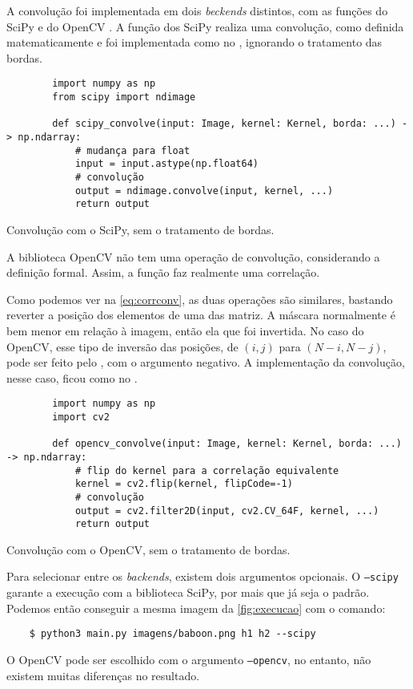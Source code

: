 A convolução foi implementada em dois \textit{beckends} distintos, com as funções  do SciPy \autocite{ref:ndimage} e  do OpenCV \autocite{ref:cvfilter}. A função dos SciPy realiza uma convolução, como definida matematicamente e foi implementada como no , ignorando o tratamento das bordas.

\begin{listing}[H]
    \begin{verbatim}
        import numpy as np
        from scipy import ndimage

        def scipy_convolve(input: Image, kernel: Kernel, borda: ...) -> np.ndarray:
            # mudança para float
            input = input.astype(np.float64)
            # convolução
            output = ndimage.convolve(input, kernel, ...)
            return output
    \end{verbatim}

    \caption{Convolução com o SciPy, sem o tratamento de bordas.}
    \label{code:scipy}
\end{listing}

A biblioteca OpenCV não tem uma operação de convolução, considerando a definição formal. Assim, a função  faz realmente uma correlação.

Como podemos ver na \cref{eq:corrconv}, as duas operações são similares, bastando reverter a posição dos elementos de uma das matriz. A máscara normalmente é bem menor em relação à imagem, então ela que foi invertida. No caso do OpenCV, esse tipo de inversão das posições, de $(i, j)$ para $(N-i, N-j)$, pode ser feito pelo  \autocite{ref:cvflip}, com o argumento  negativo. A implementação da convolução, nesse caso, ficou como no .

\begin{listing}[H]
    \begin{verbatim}
        import numpy as np
        import cv2

        def opencv_convolve(input: Image, kernel: Kernel, borda: ...) -> np.ndarray:
            # flip do kernel para a correlação equivalente
            kernel = cv2.flip(kernel, flipCode=-1)
            # convolução
            output = cv2.filter2D(input, cv2.CV_64F, kernel, ...)
            return output
    \end{verbatim}

    \caption{Convolução com o OpenCV, sem o tratamento de bordas.}
    \label{code:opencv}
\end{listing}

Para selecionar entre os \textit{backends}, existem dois argumentos opcionais. O \texttt{--scipy} garante a execução com a biblioteca SciPy, por mais que já seja o padrão. Podemos então conseguir a mesma imagem da \cref{fig:execucao} com o comando:

\begin{verbatim}
    $ python3 main.py imagens/baboon.png h1 h2 --scipy
\end{verbatim}

O OpenCV pode ser escolhido com o argumento \texttt{--opencv}, no entanto, não existem muitas diferenças no resultado.
